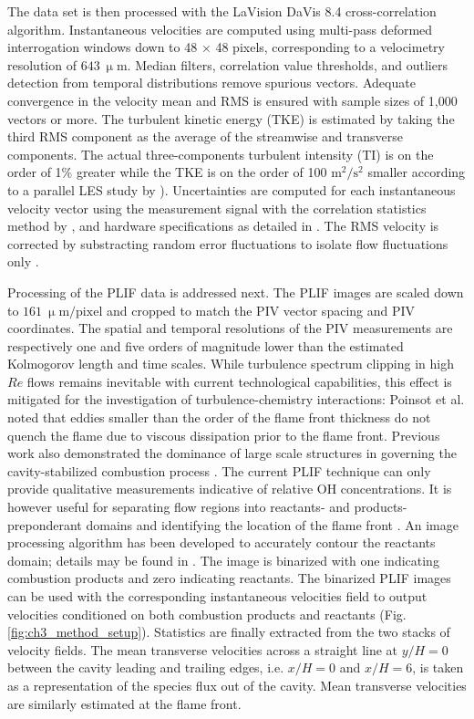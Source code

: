 The data set is then processed with the LaVision DaVis 8.4 cross-correlation algorithm. 
Instantaneous velocities are computed using multi-pass deformed interrogation windows down to 48 $\times$ 48 pixels, corresponding to a velocimetry resolution of $643~ \mathrm{\upmu m}$. Median filters, correlation value thresholds, and outliers detection from temporal distributions remove spurious vectors. Adequate convergence in the velocity mean and RMS is ensured with sample sizes of 1,000 vectors or more. The turbulent kinetic energy (TKE) is estimated by taking the third RMS component as the average of the streamwise and transverse components. The actual three-components turbulent intensity (TI) is on the order of 1\% greater while the TKE is on the order of 100 $\mathrm{m^2/s^2}$ smaller according to a parallel LES study by \cite{Nielsen2019}).
Uncertainties are computed for each instantaneous velocity vector using the measurement signal with the correlation statistics method by \cite{Wieneke2015}, and hardware specifications as detailed in \cite{LieberThesis}. The RMS velocity is corrected by substracting random error fluctuations to isolate flow fluctuations only \citep{SciacchitanoWieneke2016}. 

Processing of the PLIF data is addressed next. The PLIF images are scaled down to $161~ \mathrm{\upmu m/pixel}$ and cropped to match the PIV vector spacing and PIV coordinates. The spatial and temporal resolutions of the PIV measurements are respectively one and five orders of magnitude lower than the estimated Kolmogorov length and time scales. While turbulence spectrum clipping in high $Re$ flows remains inevitable with current technological capabilities, this effect is mitigated for the investigation of turbulence-chemistry interactions: Poinsot et al. \cite{PoinsotVeynanteCandel1991} noted that eddies smaller than the order of the flame front thickness do not quench the flame due to viscous dissipation prior to the flame front. Previous work also demonstrated the dominance of large scale structures in governing the cavity-stabilized combustion process \citep{XavierVandelGodardEtAl2016}. 
The current PLIF technique can only provide qualitative measurements indicative of relative OH concentrations. It is however useful for separating flow regions into reactants- and products-preponderant domains and identifying the location of the flame front \citep{CantuGalloCutlerEtAl2016a}.  An image processing algorithm has been developed to accurately contour the reactants domain; details may be found in \citet{Geipel2019}. 
The image is binarized with one indicating combustion products and zero indicating reactants.  
The binarized PLIF images can be used with the corresponding instantaneous velocities field to output velocities conditioned on both combustion products and reactants (Fig. \ref{fig:ch3_method_setup}). Statistics are finally extracted from the two stacks of velocity fields. The mean transverse velocities across a straight line at $y/H=0$ between the cavity leading and trailing edges, i.e. $x/H=0$ and $x/H=6$, is taken as a representation of the species flux out of the cavity. Mean transverse velocities are similarly estimated at the flame front. 

